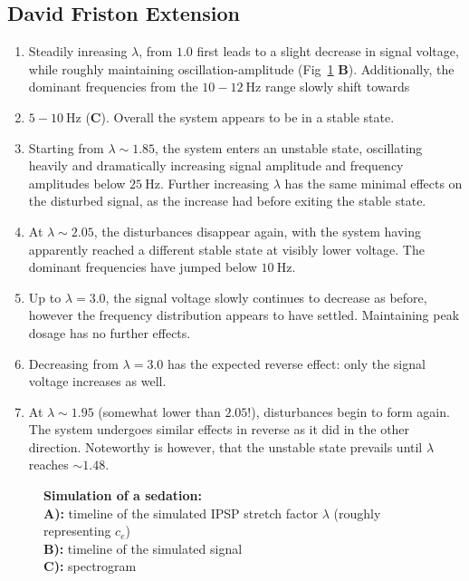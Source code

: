 \subsection{David Friston Extension}


\begin{enumerate}
    \item Steadily inreasing $ \lambda $, from $1.0$ first leads to a slight decrease in signal voltage, while roughly
    maintaining
    oscillation-amplitude (Fig~\ref{fig:sedation_sim_df} \textbf{B}).
    Additionally, the dominant frequencies from the $ 10-12 \SI{}{\hertz} $ range slowly shift towards
    \item $ 5-10 \SI{}{\hertz} $ (\textbf{C}).
    Overall the system appears to be in a stable state.

    \item Starting from $ \lambda \sim 1.85 $, the system enters an unstable state, oscillating heavily and dramatically
    increasing signal amplitude and frequency amplitudes below $ \SI{25}{\hertz} $.
    Further increasing $\lambda$ has the same minimal effects on the disturbed signal,
    as the increase had before exiting the stable state.

    \item At $\lambda \sim 2.05 $, the disturbances disappear again, with the system having apparently reached a different
    stable state at visibly lower voltage.
    The dominant frequencies have jumped below $\SI{10}{\hertz}$.

    \item Up to $\lambda = 3.0$, the signal voltage slowly continues to decrease as before,
    however the frequency distribution appears to have settled.
    Maintaining peak dosage has no further effects.

    \item Decreasing from $\lambda = 3.0$ has the expected reverse effect: only the signal voltage increases as well.

    \item At $\lambda \sim 1.95$ (somewhat lower than $2.05$!), disturbances begin to form again.
    The system undergoes similar effects in reverse as it did in the other direction.
    Noteworthy is however, that the unstable state prevails until $\lambda$ reaches $\sim 1.48$.
\end{enumerate}

\begin{figure}[H]
\toggletrue{drawLocRoc}
\def\simRunName{linear}

\caption{\textbf{Simulation of a sedation:} \\
        \textbf{A):} timeline of the simulated IPSP stretch factor $\lambda$ (roughly representing $c_e$) \\
        \textbf{B):} timeline of the simulated signal \\
        \textbf{C):} spectrogram
}\label{fig:sedation_sim_df}
\end{figure}
